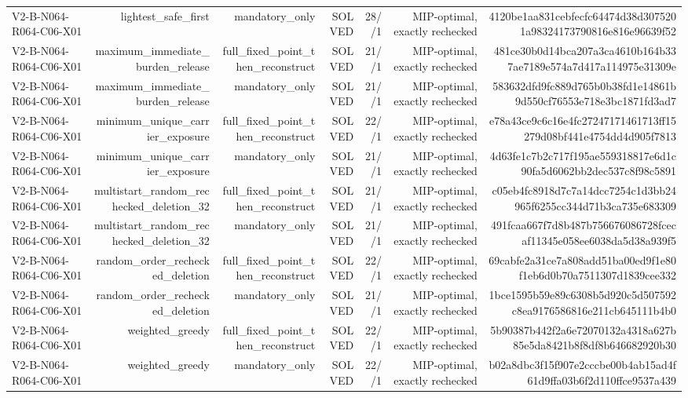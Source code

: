 {\begin{longtable}{lrrrrrr}
V2-B-N064-R064-C06-X01 & lightest\_safe\_first & mandatory\_only & SOLVED & 28//1 & MIP-optimal, exactly rechecked & 4120be1aa831cebfecfc64474d38d3075201a98324173790816e816e96639f52 \\
V2-B-N064-R064-C06-X01 & maximum\_immediate\_burden\_release & full\_fixed\_point\_then\_reconstruct & SOLVED & 21//1 & MIP-optimal, exactly rechecked & 481ce30b0d14bca207a3ca4610b164b337ae7189e574a7d417a114975e31309e \\
V2-B-N064-R064-C06-X01 & maximum\_immediate\_burden\_release & mandatory\_only & SOLVED & 21//1 & MIP-optimal, exactly rechecked & 583632dfd9fc889d765b0b38fd1e14861b9d550cf76553e718e3bc1871fd3ad7 \\
V2-B-N064-R064-C06-X01 & minimum\_unique\_carrier\_exposure & full\_fixed\_point\_then\_reconstruct & SOLVED & 22//1 & MIP-optimal, exactly rechecked & e78a43ce9c6c16e4fc27247171461713ff15279d08bf441e4754dd4d905f7813 \\
V2-B-N064-R064-C06-X01 & minimum\_unique\_carrier\_exposure & mandatory\_only & SOLVED & 21//1 & MIP-optimal, exactly rechecked & 4d63fe1c7b2c717f195ae559318817e6d1c90fa5d6062bb2dec537c8f98c5891 \\
V2-B-N064-R064-C06-X01 & multistart\_random\_rechecked\_deletion\_32 & full\_fixed\_point\_then\_reconstruct & SOLVED & 21//1 & MIP-optimal, exactly rechecked & c05eb4fc8918d7c7a14dcc7254c1d3bb24965f6255cc344d71b3ca735e683309 \\
V2-B-N064-R064-C06-X01 & multistart\_random\_rechecked\_deletion\_32 & mandatory\_only & SOLVED & 21//1 & MIP-optimal, exactly rechecked & 491fcaa667f7d8b487b756676086728fcecaf11345e058ee6038da5d38a939f5 \\
V2-B-N064-R064-C06-X01 & random\_order\_rechecked\_deletion & full\_fixed\_point\_then\_reconstruct & SOLVED & 22//1 & MIP-optimal, exactly rechecked & 69cabfe2a31ce7a808add51ba00ed9f1e80f1eb6d0b70a7511307d1839cee332 \\
V2-B-N064-R064-C06-X01 & random\_order\_rechecked\_deletion & mandatory\_only & SOLVED & 21//1 & MIP-optimal, exactly rechecked & 1bce1595b59e89c6308b5d920c5d507592c8ea9176586816e211cb645111b4b0 \\
V2-B-N064-R064-C06-X01 & weighted\_greedy & full\_fixed\_point\_then\_reconstruct & SOLVED & 22//1 & MIP-optimal, exactly rechecked & 5b90387b442f2a6e72070132a4318a627b85e5da8421b8f8df8b646682920b30 \\
V2-B-N064-R064-C06-X01 & weighted\_greedy & mandatory\_only & SOLVED & 22//1 & MIP-optimal, exactly rechecked & b02a8dbc3f15f907e2cccbe00b4ab15ad4f61d9ffa03b6f2d110ffce9537a439 \\

\end{longtable}}
